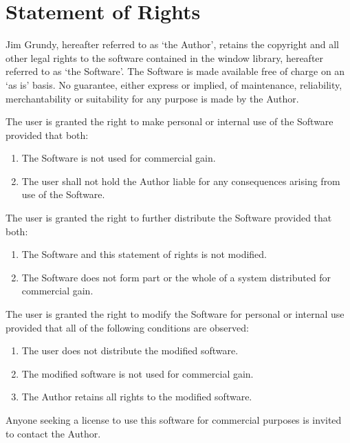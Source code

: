 \newcommand{\hand}{\tt/\symbol{"5C}}
\newcommand{\hor}{\tt\symbol{"5C}/}
\newcommand{\hnot}{\tt\symbol{"7E}}

\newcommand{\nn}[1]{#1n}


\chapter{Statement of Rights}

Jim Grundy, hereafter referred to as `the Author', retains the
copyright and all other legal rights to the software contained in
the window library, hereafter referred to as `the Software'.
The Software is made available free of charge on an `as is' basis.
No guarantee, either express or implied, of maintenance, reliability,
merchantability or suitability for any purpose is made by the Author.

The user is granted the right to make personal or internal use
of the Software provided that both:
\begin{enumerate}
    \item   The Software is not used for commercial gain.
    \item   The user shall not hold the Author liable for any consequences
            arising from use of the Software.
\end{enumerate}
The user is granted the right to further distribute the Software
provided that both:
\begin{enumerate}
    \item   The Software and this statement of rights is not modified.
    \item   The Software does not form part or the whole of a system
            distributed for commercial gain.
\end{enumerate}
The user is granted the right to modify the Software for personal or
internal use provided that all of the following conditions are
observed:
\begin{enumerate}
    \item   The user does not distribute the modified software.
    \item   The modified software is not used for commercial gain.
    \item   The Author retains all rights to the modified software.
\end{enumerate}

Anyone seeking a license to use this software for commercial purposes
is invited to contact the Author.

